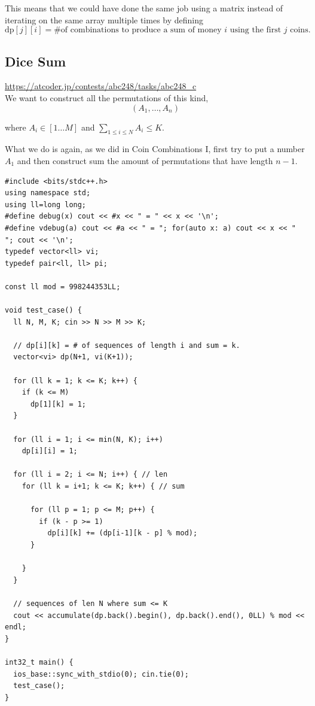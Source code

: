 This means that we could have done the same job using a matrix instead of iterating on the same array multiple times by defining
\begin{equation}
    \text{dp}[j][i] = \text{\# of combinations to produce a sum of money $i$ using the first $j$ coins}.
\end{equation}

\subsection{Dice Sum}
\url{https://atcoder.jp/contests/abc248/tasks/abc248_c} \\ 

We want to construct all the permutations of this kind,
\begin{equation}
    (A_1, \dots, A_n)
\end{equation}

where $A_i \in [1 \dots M]$ and $\sum_{1 \leq i\leq N}{A_i} \leq K$.

What we do is again, as we did in Coin Combinations I, first try to put a number $A_1$ and then construct sum the amount of permutations that have length $n - 1$. 

\begin{verbatim}
#include <bits/stdc++.h>
using namespace std;
using ll=long long;
#define debug(x) cout << #x << " = " << x << '\n';
#define vdebug(a) cout << #a << " = "; for(auto x: a) cout << x << " "; cout << '\n';
typedef vector<ll> vi;
typedef pair<ll, ll> pi;

const ll mod = 998244353LL;

void test_case() {
  ll N, M, K; cin >> N >> M >> K;

  // dp[i][k] = # of sequences of length i and sum = k.
  vector<vi> dp(N+1, vi(K+1));

  for (ll k = 1; k <= K; k++) {
    if (k <= M)
      dp[1][k] = 1;
  }

  for (ll i = 1; i <= min(N, K); i++)
    dp[i][i] = 1;
  
  for (ll i = 2; i <= N; i++) { // len
    for (ll k = i+1; k <= K; k++) { // sum

      for (ll p = 1; p <= M; p++) {
        if (k - p >= 1)
          dp[i][k] += (dp[i-1][k - p] % mod);
      }

    }
  }

  // sequences of len N where sum <= K
  cout << accumulate(dp.back().begin(), dp.back().end(), 0LL) % mod << endl;
}

int32_t main() {
  ios_base::sync_with_stdio(0); cin.tie(0);
  test_case();
}
\end{verbatim}
